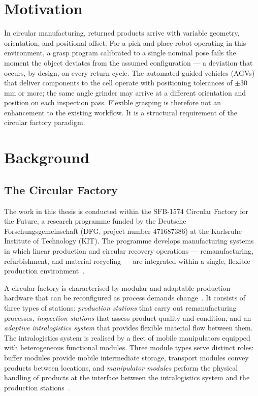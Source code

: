 \documentclass[12pt, a4paper]{report}
\begin{document}
\section{Motivation}
\label{sec:motivation}

In circular manufacturing, returned products arrive with variable geometry, orientation, and positional offset. For a pick-and-place robot operating in this environment, a grasp program calibrated to a single nominal pose fails the moment the object deviates from the assumed configuration --- a deviation that occurs, by design, on every return cycle. The automated guided vehicles (AGVs) that deliver components to the cell operate with positioning tolerances of $\pm$30\,mm or more; the same angle grinder may arrive at a different orientation and position on each inspection pass. Flexible grasping is therefore not an enhancement to the existing workflow. It is a structural requirement of the circular factory paradigm.

\section{Background}
\label{sec:background}

\subsection{The Circular Factory}
\label{sec:background-circular-factory}

The work in this thesis is conducted within the SFB-1574 Circular Factory for the Future, a research programme funded by the Deutsche Forschungsgemeinschaft (DFG, project number 471687386) at the Karlsruhe Institute of Technology (KIT). The programme develops manufacturing systems in which linear production and circular recovery operations --- remanufacturing, refurbishment, and material recycling --- are integrated within a single, flexible production environment~\cite{lanza2024vision}.

A circular factory is characterised by modular and adaptable production hardware that can be reconfigured as process demands change~\cite{bail2025circular}. It consists of three types of stations: \textit{production stations} that carry out remanufacturing processes, \textit{inspection stations} that assess product quality and condition, and an \textit{adaptive intralogistics system} that provides flexible material flow between them. The intralogistics system is realised by a fleet of mobile manipulators equipped with heterogeneous functional modules. Three module types serve distinct roles: buffer modules provide mobile intermediate storage, transport modules convey products between locations, and \textit{manipulator modules} perform the physical handling of products at the interface between the intralogistics system and the production stations~\cite{bail2025circular}.
\end{document}
